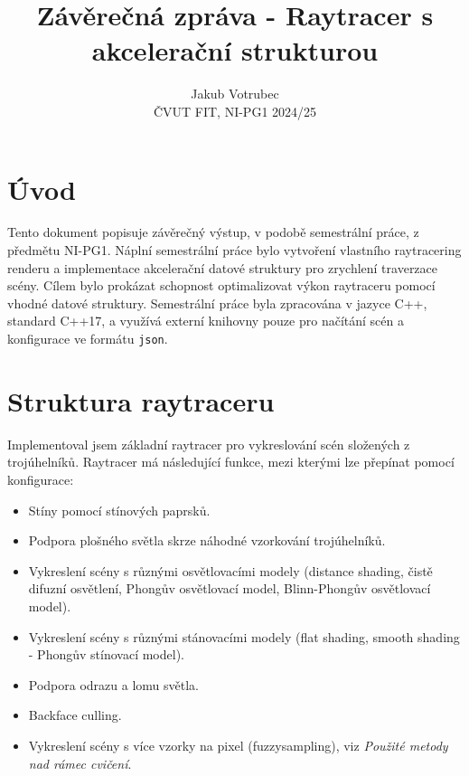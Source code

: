 \documentclass[10pt,a4paper,twocolumn]{article}
\title{\textbf{Závěrečná zpráva - Raytracer s akcelerační strukturou}}
\author{Jakub Votrubec \\
ČVUT FIT, NI-PG1 2024/25}
\date{}
\begin{document}
\maketitle


\section{Úvod}
Tento dokument popisuje závěrečný výstup, v podobě semestrální práce, z předmětu NI-PG1. Náplní semestrální práce bylo vytvoření vlastního raytracering renderu a implementace akcelerační datové struktury pro zrychlení traverzace scény. Cílem bylo prokázat schopnost optimalizovat výkon raytraceru pomocí vhodné datové struktury.
Semestrální práce byla zpracována v jazyce C++, standard C++17, a využívá externí knihovny pouze pro načítání scén a konfigurace ve formátu \texttt{json}.


\section{Struktura raytraceru}

Implementoval jsem základní raytracer pro vykreslování scén složených z trojúhelníků. Raytracer má následující funkce, mezi kterými lze přepínat pomocí konfigurace:

\begin{itemize}
    \item Stíny pomocí stínových paprsků.
    \item Podpora plošného světla skrze náhodné vzorkování trojúhelníků.
    \item Vykreslení scény s různými osvětlovacími modely (distance shading, čistě difuzní osvětlení, Phongův osvětlovací model, Blinn-Phongův osvětlovací model).
    \item Vykreslení scény s různými stánovacími modely (flat shading, smooth shading - Phongův stínovací model).
    \item Podpora odrazu a lomu světla.
    \item Backface culling.
    \item Vykreslení scény s více vzorky na pixel (fuzzysampling), viz \textit{Použité metody nad rámec cvičení}.
\end{itemize}
\end{document}
